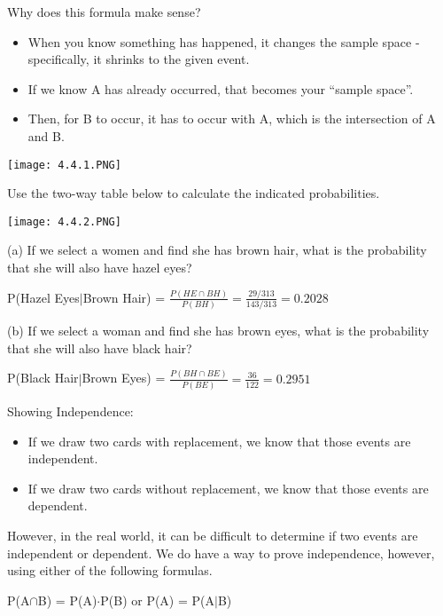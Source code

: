 \documentclass[../stats.tex]{subfiles}
\begin{document}
Why does this formula make sense?
\begin{itemize}
    \item When you know something has happened, it changes the sample space - specifically, it shrinks to the given event.
    \item If we know A has already occurred, that becomes your ``sample space''.
    \item Then, for B to occur, it has to occur with A, which is the intersection of A and B.
\end{itemize}
\begin{center}
    \texttt{[image: 4.4.1.PNG]}
\end{center}

\begin{example}
    Use the two-way table below to calculate the indicated probabilities.
    \begin{center}
        \texttt{[image: 4.4.2.PNG]}
    \end{center}

    (a) If we select a women and find she has brown hair, what is the probability that she will also have hazel eyes?

    P(Hazel Eyes$|$Brown Hair) = $\frac{P(HE\cap BH)}{P(BH)} = \frac{29/313}{143/313}= 0.2028$

    (b) If we select a woman and find she has brown eyes, what is the probability that she will also have black hair?

    P(Black Hair$|$Brown Eyes) = $\frac{P(BH\cap BE)}{P(BE)} = \frac{36}{122} = 0.2951$
\end{example}

Showing Independence:
\begin{itemize}
    \item If we draw two cards with replacement, we know that those events are independent.
    \item If we draw two cards without replacement, we know that those events are dependent.
\end{itemize}

However, in the real world, it can be difficult to determine if two events are independent or dependent. We do have a way to prove independence, however, using either of the following formulas.
\begin{center}
    P(A$\cap$B) = P(A)$\cdot$P(B) or P(A) = P(A$|$B)
\end{center}
\end{document}
